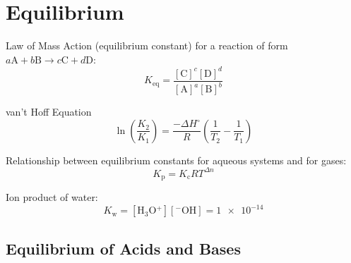 \documentclass[10pt]{article}
\begin{document}

\newpage
\section{Equilibrium}


Law of Mass Action (equilibrium constant) for a reaction of form $a\textrm{A}+b\textrm{B} \longrightarrow c\textrm{C}+d\textrm{D}$:
\begin{equation*}
K_\textrm{eq} = \frac{[\textrm{C}]^c[\textrm{D}]^d}{[\textrm{A}]^a[\textrm{B}]^b}
\end{equation*}

van't Hoff Equation
\begin{equation*}
\ln \left(\frac{K_2}{K_1}\right) = \frac{-\Delta H^\circ}{R}\left(\frac{1}{T_2}-\frac{1}{T_1}\right)
\end{equation*}

Relationship between equilibrium constants for aqueous systems and for gases:
\begin{equation*}
K_\textrm{p} = K_\textrm{c}RT^{\Delta n}
\end{equation*}

Ion product of water:
\begin{equation*}
K_\textrm{w} = [\textrm{H$_3$O$^{+}$}][\textrm{$^{-}$OH}] = \num{1e-14}
\end{equation*}


\subsection{Equilibrium of Acids and Bases}
\end{document}
